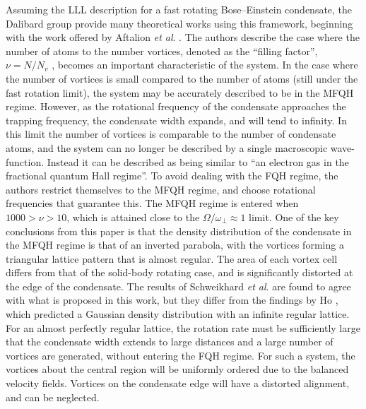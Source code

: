 Assuming the LLL description for a fast rotating Bose--Einstein condensate, the Dalibard group provide many theoretical works using this framework, beginning with the work offered by Aftalion \textit{et al}. \cite{Vtx:Aftalion_pra_2005}. The authors describe the case where the number of
atoms to the number vortices, denoted as the ``filling factor'', $\nu=N/N_v$ \cite{BK:Ueda_2010,Vtx:Ho_prl_2001}, becomes an important characteristic of the system. In the case where the number of vortices is small compared to the number of atoms (still under the fast rotation limit), the system may be accurately described to be in the MFQH regime. However, as the rotational frequency of the condensate approaches the trapping frequency, the condensate width expands, and will tend to infinity. In this limit the number of vortices is comparable to the number of condensate atoms, and the system can no longer be described by a single macroscopic wave-function. Instead it can be described as being similar to ``an electron gas in the fractional quantum Hall regime''. To avoid dealing with the FQH regime, the authors restrict themselves to the MFQH regime, and choose rotational frequencies that guarantee this. The MFQH regime is entered when $1000 > \nu > 10$, which is attained close to the $\Omega / \omega_{\perp}\approx 1$ limit. One of the key conclusions from this paper is that the density distribution of the condensate in the MFQH regime is that of an inverted parabola, with the vortices forming a triangular lattice pattern that is almost regular. The area of each vortex cell differs from that of the solid-body rotating case, and is significantly distorted at the edge of the condensate. The results of Schweikhard \textit{et al}. \cite{Vtx:Schweikhard_prl_2004} are found to agree with what is proposed in this work, but they differ from the findings by Ho \cite{Vtx:Ho_prl_2001}, which predicted a Gaussian density distribution with an infinite regular lattice. For an almost perfectly regular lattice, the rotation rate must be sufficiently large that the condensate width extends to large distances and a large number of vortices are generated, without entering the FQH regime. For such a system, the vortices about the central region will be uniformly ordered due to the balanced velocity fields. Vortices on the condensate edge will have a distorted alignment, and can be neglected.

